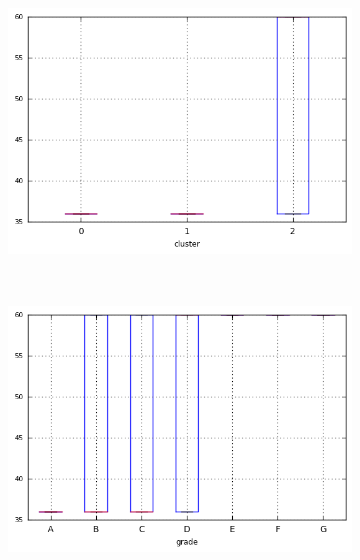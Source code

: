 \begin{anexosenv}
\begin{figure}[ht!]
\begin{subfigure}[t]{0.45\textwidth}
        \end{subfigure}


\end{figure}

\begin{figure}[t!]
    \centering
        \caption{\emph{Boxplots} de term\textunderscore float\textunderscore fee }
        \begin{subfigure}[t]{0.45\textwidth}
            \centering

            \centerline{\includegraphics[width=1\textwidth]{img/term_float_by_cluster}}
        \end{subfigure}%
        ~ 
        \begin{subfigure}[t]{0.45\textwidth}
            \centering
   
            \centerline{\includegraphics[width=1\textwidth]{img/term_float_by_grade}}


\end{subfigure}
\end{figure}
\end{anexosenv}

